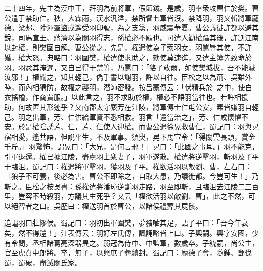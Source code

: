 \begin{pinyinscope}
二十四年，先主為漢中王，拜羽為前將軍，假節鉞。是歲，羽率衆攻曹仁於樊。曹公遣于禁助仁。秋，大霖雨，漢水汎溢，禁所督七軍皆沒。禁降羽，羽又斬將軍龐德。梁郟、陸渾羣盜或遙受羽印號，為之支黨，羽威震華夏。曹公議徙許都以避其銳，司馬宣王、蔣濟以為關羽得志，孫權必不願也。可遣人勸權躡其後，許割江南以封權，則樊圍自解。曹公從之。先是，權遣使為子索羽女，羽罵辱其使，不許婚，權大怒。典略曰：羽圍樊，權遣使求助之，勑使莫速進，又遣主簿先致命於羽。羽忿其淹遲，又自已得于禁等，乃罵曰：「狢子敢爾，如使樊城拔，吾不能滅汝邪！」權聞之，知其輕己，偽手書以謝羽，許以自往。臣松之以為荊、吳雖外睦，而內相猜防，故權之襲羽，潛師密發。按呂蒙傳云：「伏精兵於𦩷𦪇之中，使白衣搖櫓，作商賈服。」以此言之，羽不求助於權，權必不語羽當往也。若許相援助，何故匿其形迹乎？又南郡太守麋芳在江陵，將軍傅士仁屯公安，素皆嫌羽自輕己。羽之出軍，芳、仁供給軍資不悉相救。羽言「還當治之」，芳、仁咸懷懼不安。於是權陰誘芳、仁，芳、仁使人迎權。而曹公遣徐晃救曹仁，蜀記曰：羽與晃宿相愛，遙共語，但說平生，不及軍事。須臾，晃下馬宣令：「得關雲長頭，賞金千斤。」羽驚怖，謂晃曰：「大兄，是何言邪！」晃曰：「此國之事耳。」羽不能克，引軍退還。權已據江陵，盡虜羽士衆妻子，羽軍遂散。權遣將逆擊羽，斬羽及子平于臨沮。蜀記曰：權遣將軍擊羽，獲羽及子平。權欲活羽以敵劉、曹，左右曰：「狼子不可養，後必為害。曹公不即除之，自取大患，乃議徙都。今豈可生！」乃斬之。臣松之桉吳書：孫權遣將潘璋逆斷羽走路，羽至即斬，且臨沮去江陵二三百里，豈容不時殺羽，方議其生死乎？又云「權欲活羽以敵劉、曹」，此之不然，可以絕智者之口。吳歷曰：權送羽首於曹公，以諸侯禮葬其屍骸。

追謚羽曰壯繆侯。蜀記曰：羽初出軍圍樊，夢豬嚙其足，語子平曰：「吾今年衰矣，然不得還！」江表傳云：羽好左氏傳，諷誦略皆上口。子興嗣。興字安國，少有令問，丞相諸葛亮深器異之。弱冠為侍中、中監軍，數歲卒。子統嗣，尚公主，官至虎賁中郎將。卒，無子，以興庶子彝續封。蜀記曰：龐德子會，隨鍾、鄧伐蜀，蜀破，盡滅關氏家。


\end{pinyinscope}